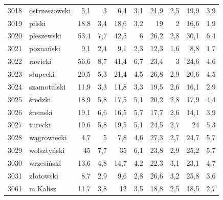 \begin{center}
\begin{longtable}{lp{3cm}rrrrrrrr}
3018 & ostrzeszowski           & 5,1     & 3           & 6,4      & 3,1          & 21,9     & 2,5          & 19,9     & 3,9          \\
3019 & pilski                  & 18,8    & 3,4         & 18,6     & 3,2          & 19       & 2            & 16,6     & 1,9          \\
3020 & pleszewski              & 53,4    & 7,7         & 42,5     & 6            & 26,2     & 2,8          & 30,1     & 6,4          \\
3021 & poznański               & 9,1     & 2,4         & 9,1      & 2,3          & 12,3     & 1,6          & 8,8      & 1,7          \\
3022 & rawicki                 & 56,6    & 8,7         & 41,4     & 6,7          & 23,4     & 3            & 24,6     & 4,6          \\
3023 & słupecki                & 20,5    & 5,3         & 21,4     & 4,5          & 26,8     & 2,9          & 20,6     & 4,5          \\
3024 & szamotulski             & 11,9    & 3,3         & 11,8     & 3,3          & 19,5     & 2,6          & 16,1     & 2,9          \\
3025 & średzki                 & 18,9    & 5,8         & 17,5     & 5,1          & 20,2     & 2,8          & 17,9     & 4,4          \\
3026 & śremski                 & 19,1    & 6,6         & 16,5     & 5,7          & 17,7     & 2,6          & 14,1     & 3,9          \\
3027 & turecki                 & 19,6    & 5,8         & 19,5     & 5,1          & 24,5     & 2,7          & 24       & 5,3          \\
3028 & wągrowiecki             & 4,7     & 5           & 7,8      & 4,6          & 27,3     & 2,7          & 24,7     & 5,7          \\
3029 & wolsztyński             & 45      & 7,7         & 35       & 6,1          & 23,8     & 2,9          & 25,2     & 5,7          \\
3030 & wrzesiński              & 13,6    & 4,8         & 14,7     & 4,2          & 22,3     & 3,1          & 23,1     & 4,7          \\
3031 & złotowski               & 8,7     & 2,9         & 9,6      & 2,8          & 26,6     & 3,2          & 25,8     & 3,6          \\
3061 & m.Kalisz                & 11,7    & 3,8         & 12       & 3,5          & 18,8     & 2,5          & 18,5     & 2,7          \\

\end{longtable}
\end{center}

